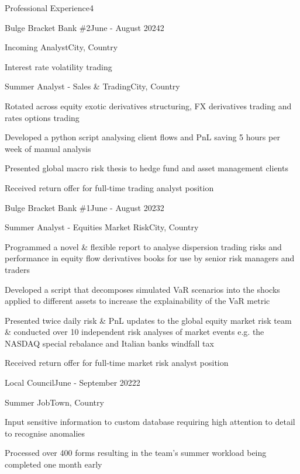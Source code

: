 \documentclass[10pt,a4paper]{CV}
\begin{document}
\begin{Section}{Professional Experience}{4}
    \begin{Institution}{Bulge Bracket Bank \#2}{June - August 2024}{2}
        \begin{Position}{Incoming Analyst}{City, Country}
            \item Interest rate volatility trading
            \vspace{-4pt}
        \end{Position}
        \begin{Position}{Summer Analyst - Sales \& Trading}{City, Country}
            \item Rotated across equity exotic derivatives structuring, FX derivatives trading and rates options trading
            \item Developed a python script analysing client flows and PnL saving 5 hours per week of manual analysis
            \item Presented global macro risk thesis to hedge fund and asset management clients
            \item Received return offer for full-time trading analyst position
        \end{Position}
    \end{Institution}
    
    \begin{Institution}{Bulge Bracket Bank \#1}{June - August 2023}{2}
        \begin{Position}{Summer Analyst - Equities Market Risk}{City, Country}
            \item Programmed a novel \& flexible report to analyse dispersion trading risks and performance in equity flow derivatives books for use by senior risk managers and traders
            \item Developed a script that decomposes simulated VaR scenarios into the shocks applied to different assets to increase the explainability of the VaR metric
            \item Presented twice daily risk \& PnL updates to the global equity market risk team \& conducted over 10 independent risk analyses of market events e.g. the NASDAQ special rebalance and Italian banks windfall tax
            \item Received return offer for full-time market risk analyst position
        \end{Position}
    \end{Institution}
    
    \begin{Institution}{Local Council}{June - September 2022}{2}
        \begin{Position}{Summer Job}{Town, Country}
            \item Input sensitive information to custom database requiring high attention to detail to recognise anomalies
            \item Processed over 400 forms resulting in the team’s summer workload being completed one month early
        \end{Position}
    \end{Institution}
\end{Section}
\end{document}
